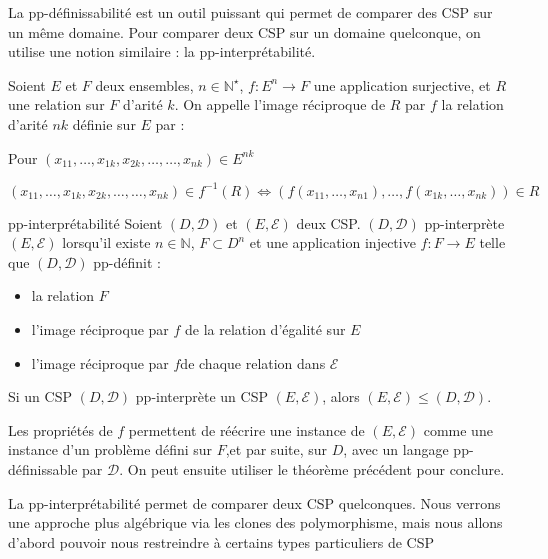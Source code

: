 La pp-définissabilité est un outil puissant qui permet de comparer des CSP sur un même domaine. Pour comparer deux CSP sur un domaine quelconque, on utilise une notion similaire : la pp-interprétabilité.

\begin{defi}{}
Soient $E$ et $F$ deux ensembles, $n \in \mathbb{N}^\star$, $f : E^n \rightarrow F$ une application surjective, et $R$ une relation sur $F$ d'arité $k$. On appelle l'image réciproque de $R$ par $f$ la relation d'arité $nk$ définie sur $E$ par :

Pour $(x_{11},\dots,x_{1k},x_{2k},\dots,\dots,x_{nk}) \in E^{nk}$

$$(x_{11},\dots,x_{1k},x_{2k},\dots,\dots,x_{nk}) \in f^{-1}(R) \iff (f(x_{11},\dots,x_{n1}),\dots,f(x_{1k},\dots,x_{nk})) \in R$$
\end{defi}

\begin{defi}{pp-interprétabilité}
Soient $(D,\mathcal{D})$ et $(E,\mathcal{E})$ deux CSP. $(D,\mathcal{D})$ pp-interprète $(E,\mathcal{E})$ lorsqu'il existe $n \in \mathbb{N}$, $F \subset D^n$ et une application injective $f : F \rightarrow E$ telle que $(D,\mathcal{D})$ pp-définit :
\begin{itemize}
	\item la relation $F$
	\item l'image réciproque par $f$ de la relation d'égalité sur $E$
	\item l'image réciproque par $f$de chaque relation dans $\mathcal{E}$
\end{itemize}
\end{defi}

\begin{theo}
Si un CSP $(D,\mathcal{D})$ pp-interprète un CSP $(E,\mathcal{E})$, alors $(E,\mathcal{E}) \leq (D,\mathcal{D})$.
\end{theo}

\begin{pv}
Les propriétés de $f$ permettent de réécrire une instance de $(E,\mathcal{E})$ comme une instance d'un problème défini sur $F$,et par suite, sur $D$, avec un langage pp-définissable par $\mathcal{D}$. On peut ensuite utiliser le théorème précédent pour conclure.
\end{pv}

La pp-interprétabilité permet de comparer deux CSP quelconques. Nous verrons une approche plus algébrique via les clones des polymorphisme, mais nous allons d'abord pouvoir nous restreindre à certains types particuliers de CSP

